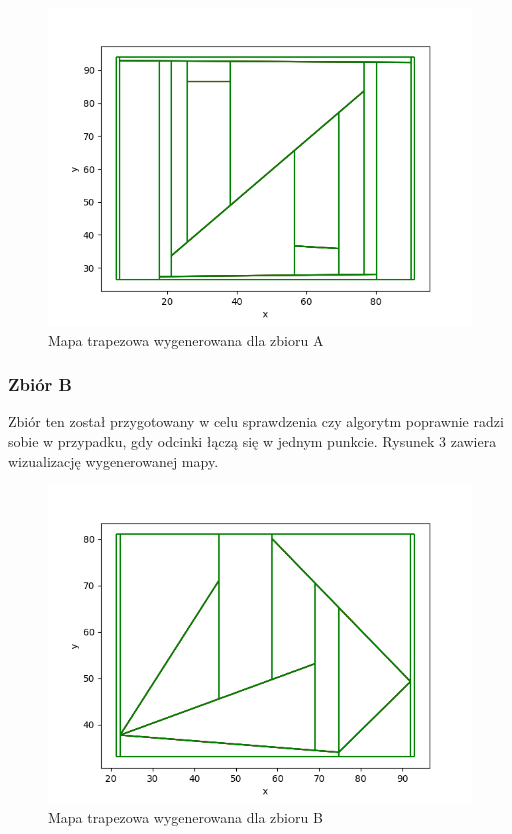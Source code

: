 \documentclass[11pt,a4paper]{article}
\begin{document}
\begin{figure}[H]
    \centering
    \includegraphics[scale=0.5]{./res/figs/test_a_map.png}
    \caption{Mapa trapezowa wygenerowana dla zbioru A}
\end{figure}

\subsubsection{Zbiór B}
Zbiór ten został przygotowany w celu sprawdzenia
czy algorytm poprawnie radzi sobie w przypadku,
gdy odcinki łączą się w jednym punkcie. Rysunek 3
zawiera wizualizację wygenerowanej mapy.

\begin{figure}[H]
    \centering
    \includegraphics[scale=0.5]{./res/figs/test_b_map.png}
    \caption{Mapa trapezowa wygenerowana dla zbioru B}
\end{figure}
\end{document}
